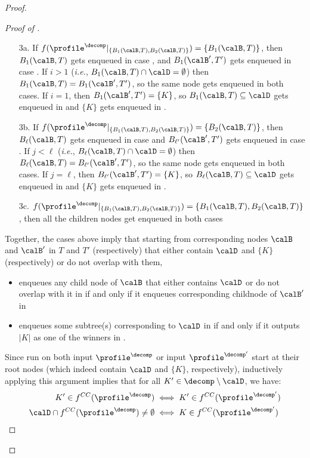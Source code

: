 \begin{proof}
\begin{proof}[Proof of ]
\begin{enumerate}
            \begin{itemize}
                \item[3a.] If $f(\profile^{\decomp}|_{\{B_1(\calB,T),B_2(\calB,T)\}})=\{B_1(\calB,T)\}$, then $B_1(\calB,T)$ gets enqueued in case \casea, and $B_1(\calB',T')$ gets enqueued in case \caseb. If $i>1$ (\emph{i.e.}, $B_1(\calB,T) \cap \calD =\emptyset$)  then $B_1(\calB,T)=B_1(\calB',T')$, so the same node gets enqueued in both cases. If $i=1$, then $B_1(\calB',T')=\{K\}$, so $B_1(\calB,T)  \subseteq \calD$ gets enqueued in \casea and $\{K\}$ gets enqueued in \caseb.
                \item[3b.] If $f(\profile^{\decomp}|_{\{B_1(\calB,T),B_2(\calB,T)\}})=\{B_2(\calB,T)\}$, then $B_\ell(\calB,T)$ gets enqueued in case \casea and $B_{\ell'}(\calB',T')$ gets enqueued in case \caseb. If $j<\ell$ (\emph{i.e.}, $B_\ell(\calB,T) \cap \calD =\emptyset$)  then $B_{\ell}(\calB,T)=B_{\ell'}(\calB',T')$, so the same node gets enqueued in both cases. If $j=\ell$, then $B_{\ell'}(\calB',T')=\{K\}$, so $B_\ell(\calB,T)  \subseteq \calD$ gets enqueued in \casea and $\{K\}$ gets enqueued in \caseb.
                \item[3c. ] $f(\profile^{\decomp}|_{\{B_1(\calB,T),B_2(\calB,T)\}})=\{B_1(\calB,T),B_2(\calB,T)\}$, then all the children nodes get enqueued in both cases
            \end{itemize}
        \end{enumerate}
    Together, the cases above imply that starting from corresponding nodes $\calB$ and $\calB'$ in $T$ and $T'$ (respectively) that either contain $\calD$ and $\{K\}$ (respectively) or do not overlap with them,
    \begin{itemize}
        \item {} enqueues any child node of $\calB$ that either contains $\calD$ or do not overlap with it in \casea if and only if it enqueues corresponding childnode of $\calB'$ in \caseb
        \item {} enqueues some subtree(s) corresponding to $\calD$ in \casea if and only if it outputs $|K|$ as one of the winners in \caseb.
    \end{itemize}
    Since  run on both input $\profile^\decomp$ or input $\profile^{\decomp'}$ start at their root nodes (which indeed contain $\calD$ and $\{K\}$, respectively), inductively applying this argument implies that for all $K' \in \decomp \setminus \calD$, we have:
    \begin{align}
        K' \in f^{CC}(\profile^\decomp) &\iff  K' \in f^{CC}(\profile^{\decomp'})\label{eq:non_d}\\
        \calD \cap f^{CC}(\profile^\decomp) \neq \emptyset &\iff  K \in f^{CC}(\profile^{\decomp'})\label{eq:yes_d}
    \end{align}
    

\end{proof}
\end{proof}
